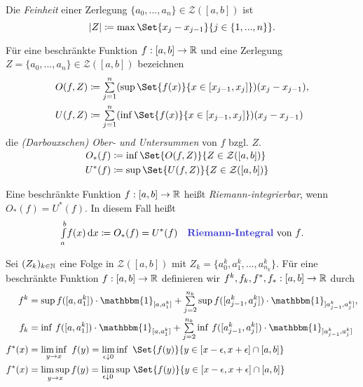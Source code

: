 \documentclass{cheat-sheet}
\newcommand{\ind}{\mathbbm{1}} %
\begin{document}
\begin{defn}
  Die \emph{Feinheit} einer Zerlegung $\{ a_0, ..., a_n \} \in \mathcal{Z}([a, b])$ ist
  \[ \left|Z\right| \coloneqq \max \Set{ x_j - x_{j-1} }{ j \in \{ 1, ..., n \} }. \]
\end{defn}

\begin{defn}
  Für eine beschränkte Funktion $f : [a, b] \to \mathbb{R}$ und eine Zerlegung $Z = \{ a_0, ..., a_n \} \in \mathcal{Z}([a, b])$ bezeichnen
  \begin{align*}
    O(f, Z) &\coloneqq \sum_{j=1}^n (\sup \Set{ f(x) }{ x \in [x_{j-1}, x_j] })(x_j - x_{j-1}),\\
    U(f, Z) &\coloneqq \sum_{j=1}^n (\inf \Set{ f(x) }{ x \in [x_{j-1}, x_j] })(x_j - x_{j-1})
  \end{align*}
  die \emph{(Darbouxschen) Ober- und Untersummen} von $f$ bzgl. $Z$.
\end{defn}

\begin{nota}
  \begin{align*}\\[-24pt]
    O_*(f) &\coloneqq \inf \Set{ O(f, Z) }{ Z \in \mathcal{Z}([a, b]) }\\
    U^*(f) &\coloneqq \sup \Set{ U(f, Z) }{ Z \in \mathcal{Z}([a, b]) }\\
  \end{align*}
\end{nota}

\begin{defn}
  Eine beschränkte Funktion $f : [a, b] \to \mathbb{R}$ heißt \emph{Riemann-integrierbar}, wenn $O_*(f) = U^*(f)$. In diesem Fall heißt
  \[ \Int{a}{b}{f(x)}{x} \coloneqq O_*(f) = U^*(f) \quad \text{\emph{Riemann-Integral} von $f$.} \]
\end{defn}

\begin{nota}
  Sei $(Z_k)_{k \in \mathbb{N}}$ eine Folge in $\mathcal{Z}([a, b])$ mit $Z_k = \{ a_0^k, a_1^k, ..., a^k_{n_k} \}$. Für eine beschränkte Funktion $f : [a, b] \to \mathbb{R}$ definieren wir $f^k, f_k, f^*, f_* : [a, b] \to \mathbb{R}$ durch
  \begin{align*}
    f^k &= \sup f([a, a_1^k]) \cdot \ind_{[a, a_1^k]} + \sum_{j=2}^{n_k} \sup f([a_{j-1}^k, a_j^k]) \cdot \ind_{]a_{j-1}^k, a_j^k]},\\
    f_k &= \inf \, f([a, a_1^k]) \cdot \ind_{[a, a_1^k]} + \sum_{j=2}^{n_k} \inf \, f([a_{j-1}^k, a_j^k]) \cdot \ind_{]a_{j-1}^k, a_j^k]}\\
    f^*(x) &= \liminf_{y \to x}\,\, f(y) = \lim_{\epsilon \downarrow 0} \inf\,\, \Set{ f(y) }{ y \in [x-\epsilon, x+\epsilon] \cap [a, b]}\\
    f^*(x) &= \limsup_{y \to x} f(y) = \lim_{\epsilon \downarrow 0} \sup \, \Set{ f(y) }{ y \in [x-\epsilon, x+\epsilon] \cap [a, b]}
  \end{align*}
\end{nota}
\end{document}
